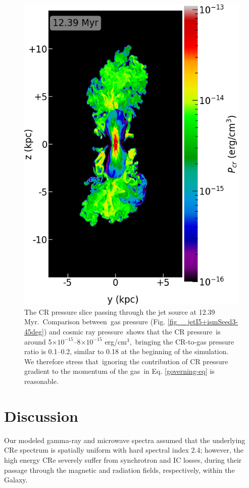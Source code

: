 \documentclass[fleqn,usenatbib,useAMS]{mnras}
\begin{document}
  \begin{figure}
    \includegraphics[width=\columnwidth]{figures/fig__jetI5+ismSeed3-45deg-CR.png}
    \caption{
     The CR pressure slice passing through the jet source at 12.39 Myr.\
     Comparison between\
     gas pressure (Fig. \ref{fig__jetI5+ismSeed3-45deg}) and cosmic ray pressure\
     shows that
     the CR pressure\
     is around 5$\times10^{-15}$--8$\times10^{-15}$ erg/cm$^{3}$,\
     bringing the CR-to-gas pressure ratio is 0.1--0.2,
     similar to 0.18 at the beginning of the simulation.
     We therefore stress that\
     ignoring the contribution of CR pressure gradient to the momentum of the gas\
     in Eq. \ref{governing-eq} is reasonable.
     }
    \label{fig__jetI5+ismSeed3-45deg-CR}
  \end{figure}

\section{Discussion}
Our modeled gamma-ray and microwave spectra assumed that
the underlying CRe spectrum is spatially uniform with hard spectral index 2.4;
however, the high energy CRe severely suffer from synchrotron and IC losses,
during their passage through the magnetic and radiation fields, respectively, within the Galaxy.
\end{document}
